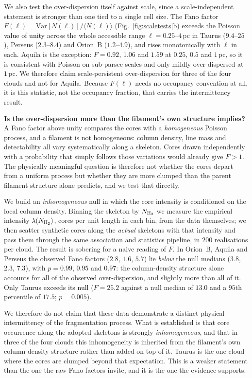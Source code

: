 \documentclass[usenatbib,twoside,twocolumn]{mnras}
\begin{document}
We also test the over-dispersion itself against scale, since a scale-independent statement is stronger than one tied to a single cell size. The Fano factor $F(\ell)=\mathrm{Var}[N(\ell)]/\langle N(\ell)\rangle$ (Fig.~\ref{fig:scaletests}b) exceeds the Poisson value of unity across the whole accessible range $\ell=0.25$--$4$\,pc in Taurus ($9.4$--$25$), Perseus ($2.3$--$8.4$) and Orion~B ($1.2$--$4.9$), and rises monotonically with $\ell$ in each. Aquila is the exception: $F=0.92$, $1.06$ and $1.59$ at $0.25$, $0.5$ and $1$\,pc, so it is consistent with Poisson on sub-parsec scales and only mildly over-dispersed at $1$\,pc. We therefore claim scale-persistent over-dispersion for three of the four clouds and not for Aquila. Because $F(\ell)$ needs no occupancy convention at all, it is this statistic, not the occupancy fraction, that carries the intermittency result.

\smallskip\noindent\textbf{Is the over-dispersion more than the filament's own structure implies?} A Fano factor above unity compares the cores with a \emph{homogeneous} Poisson process, and a filament is not homogeneous: column density, line mass and detectability all vary systematically along a skeleton. Cores drawn independently with a probability that simply follows those variations would already give $F>1$. The physically meaningful question is therefore not whether the cores depart from a uniform process but whether they are more clumped than the parent filament structure alone predicts, and we test that directly.

We build an \emph{inhomogeneous} null in which the core intensity is conditioned on the local column density. Binning the skeleton by $N_{\rm H_2}$ we measure the empirical intensity $\lambda(N_{\rm H_2})$, cores per unit length in each bin, from the data themselves; we then scatter synthetic cores along the \emph{actual} skeletons with that intensity and pass them through the same association and statistics pipeline, in $200$ realisations per cloud. The result is sobering for a naive reading of $F$. In Orion~B, Aquila and Perseus the observed Fano factors ($2.8$, $1.6$, $5.7$) lie \emph{below} the null medians ($3.8$, $2.3$, $7.3$), with $p=0.99$, $0.95$ and $0.97$: the column-density structure alone accounts for all of the observed over-dispersion, and slightly more than all of it. Only Taurus exceeds its null ($F=25.2$ against a null median of $13.0$ and a $95$th percentile of $17.5$; $p=0.005$).

We therefore do not claim that these data demonstrate a distinct physical intermittency of the fragmentation process. What is established is that core occurrence along the adopted skeletons is strongly \emph{inhomogeneous}, and that in three of the four clouds this inhomogeneity is inherited from the filament's own column-density structure rather than added on top of it. Taurus is the one cloud where the cores are clumped beyond that expectation. This is a weaker statement than the one the raw Fano factors invite, and it is the one the evidence supports.
\end{document}
